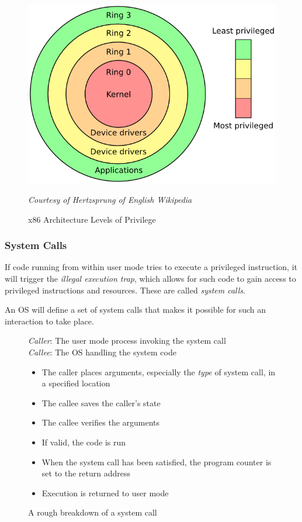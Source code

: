 \documentclass{article}
\begin{document}
\begin{figure}[h!]
  \centering
  \includegraphics[scale=0.35]{privilegeGraphX86}
  \caption{x86 Architecture Levels of Privilege}
  \textit{\footnotesize Courtesy of Hertzsprung of English Wikipedia}
\end{figure}

\subsubsection{System Calls}

If code running from within user mode tries to execute a privileged instruction, it will trigger the \textit{illegal execution trap}, which allows for such code to gain access to privileged instructions and resources. These are called \textit{system calls}.

An OS will define a set of system calls that makes it possible for such an interaction to take place.

\begin{figure}[H]
  \begin{framed}
    \textit{Caller}: The user mode process invoking the system call\\
    \textit{Callee}: The OS handling the system code\\
    \begin{itemize}
    \item The caller places arguments, especially the \textit{type} of system call, in a specified location
    \item The callee saves the caller's state
    \item The callee verifies the arguments
    \item If valid, the code is run
    \item When the system call has been satisfied, the program counter is set to the return address
    \item Execution is returned to user mode
    \end{itemize}
  \end{framed}
  \caption{A rough breakdown of a system call}
\end{figure}
\end{document}
